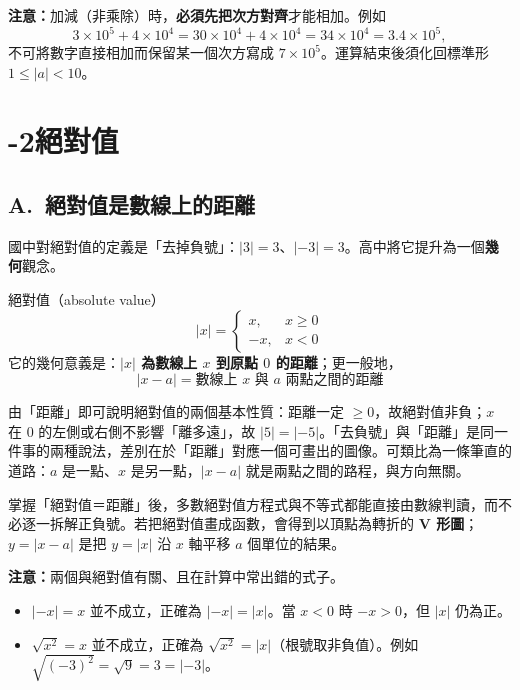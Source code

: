 \documentclass[11pt]{article}
\begin{document}
\textbf{注意：}加減（非乘除）時，\textbf{必須先把次方對齊}才能相加。例如
$$3\times10^{5}+4\times10^{4}=30\times10^{4}+4\times10^{4}=34\times10^{4}=3.4\times10^{5},$$
不可將數字直接相加而保留某一個次方寫成 $7\times10^{5}$。運算結束後須化回標準形 $1\le|a|<10$。

\section*{-2\quad 絕對值}

\subsection*{\sffamily A.\ 絕對值是數線上的距離}

國中對絕對值的定義是「去掉負號」：$|3|=3$、$|-3|=3$。高中將它提升為一個\textbf{幾何}觀念。

\begin{補充框}{絕對值（absolute value）}
$$|x|=\begin{cases}x,& x\ge0\\[2pt]-x,& x<0\end{cases}$$
它的幾何意義是：\textbf{$|x|$ 為數線上 $x$ 到原點 $0$ 的距離}；更一般地，
$$\boxed{\;|x-a|=\text{數線上 }x\text{ 與 }a\text{ 兩點之間的距離}\;}$$

由「距離」即可說明絕對值的兩個基本性質：距離一定 $\ge0$，故絕對值非負；$x$ 在 $0$ 的左側或右側不影響「離多遠」，故 $|5|=|-5|$。「去負號」與「距離」是同一件事的兩種說法，差別在於「距離」對應一個可畫出的圖像。可類比為一條筆直的道路：$a$ 是一點、$x$ 是另一點，$|x-a|$ 就是兩點之間的路程，與方向無關。
\end{補充框}


掌握「絕對值＝距離」後，多數絕對值方程式與不等式都能直接由數線判讀，而不必逐一拆解正負號。若把絕對值畫成函數，會得到以頂點為轉折的 \textbf{V 形圖}；$y=|x-a|$ 是把 $y=|x|$ 沿 $x$ 軸平移 $a$ 個單位的結果。


\textbf{注意：}兩個與絕對值有關、且在計算中常出錯的式子。
\begin{itemize}\setlength{\itemsep}{1pt}
\item $|-x|=x$ 並不成立，正確為 $|-x|=|x|$。當 $x<0$ 時 $-x>0$，但 $|x|$ 仍為正。
\item $\sqrt{x^2}=x$ 並不成立，正確為 $\sqrt{x^2}=|x|$（根號取非負值）。例如 $\sqrt{(-3)^2}=\sqrt9=3=|-3|$。
\end{itemize}
\end{document}
